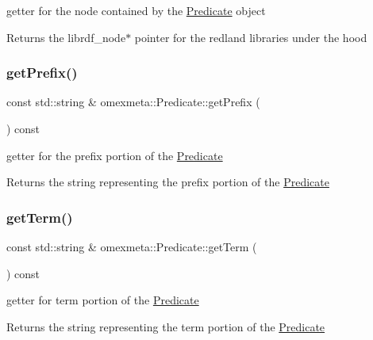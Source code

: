 getter for the node contained by the \hyperlink{classomexmeta_1_1Predicate}{Predicate} object 

\begin{DoxyReturn}{Returns}
the librdf\+\_\+node$\ast$ pointer for the redland libraries under the hood 
\end{DoxyReturn}
\mbox{\label{classomexmeta_1_1Predicate_a0147e977f71604db05763815ae6b553f}} 
\subsubsection{\texorpdfstring{get\+Prefix()}{getPrefix()}}
{\footnotesize\ttfamily const std\+::string \& omexmeta\+::\+Predicate\+::get\+Prefix (\begin{DoxyParamCaption}{ }\end{DoxyParamCaption}) const}



getter for the prefix portion of the \hyperlink{classomexmeta_1_1Predicate}{Predicate} 

\begin{DoxyReturn}{Returns}
the string representing the prefix portion of the \hyperlink{classomexmeta_1_1Predicate}{Predicate} 
\end{DoxyReturn}
\mbox{\label{classomexmeta_1_1Predicate_a54a15176bd697d37d00573bf86954630}} 
\subsubsection{\texorpdfstring{get\+Term()}{getTerm()}}
{\footnotesize\ttfamily const std\+::string \& omexmeta\+::\+Predicate\+::get\+Term (\begin{DoxyParamCaption}{ }\end{DoxyParamCaption}) const}



getter for term portion of the \hyperlink{classomexmeta_1_1Predicate}{Predicate} 

\begin{DoxyReturn}{Returns}
the string representing the term portion of the \hyperlink{classomexmeta_1_1Predicate}{Predicate} 
\end{DoxyReturn}
\mbox{\label{classomexmeta_1_1Predicate_a27fa7d62ad9a5182f3dd642bc61c8d9f}} 
